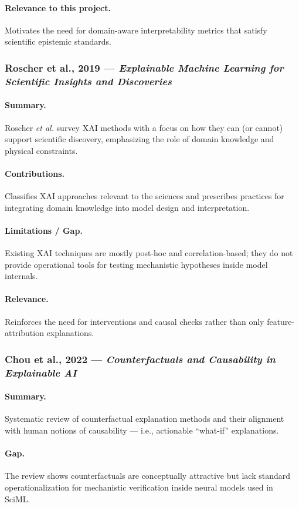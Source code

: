 \documentclass[12pt,singleside,a4paper]{article}
\begin{document}
\paragraph{Relevance to this project.}
Motivates the need for domain-aware interpretability metrics that satisfy scientific epistemic standards. 

\subsubsection{Roscher et al., 2019 — \textit{Explainable Machine Learning for Scientific Insights and Discoveries}}
\paragraph{Summary.}
Roscher \textit{et al.} survey XAI methods with a focus on how they can (or cannot) support scientific discovery, emphasizing the role of domain knowledge and physical constraints.  
\paragraph{Contributions.}
Classifies XAI approaches relevant to the sciences and prescribes practices for integrating domain knowledge into model design and interpretation.  
\paragraph{Limitations / Gap.}
Existing XAI techniques are mostly post-hoc and correlation-based; they do not provide operational tools for testing mechanistic hypotheses inside model internals.  
\paragraph{Relevance.}
Reinforces the need for interventions and causal checks rather than only feature-attribution explanations. 
\subsubsection{Chou et al., 2022 — \textit{Counterfactuals and Causability in Explainable AI}}
\paragraph{Summary.}
Systematic review of counterfactual explanation methods and their alignment with human notions of causability — i.e., actionable ``what-if'' explanations.  
\paragraph{Gap.}
The review shows counterfactuals are conceptually attractive but lack standard operationalization for mechanistic verification inside neural models used in SciML.  
\end{document}
